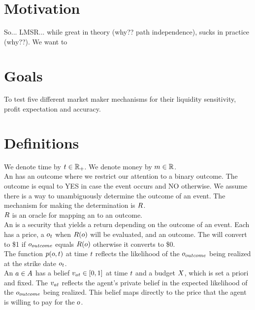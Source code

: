\section{Motivation}

So... LMSR... while great in theory (why?? path independence), sucks in practice (why??).
We want to 

\section{Goals}
To test five different market maker mechanisms for their liquidity sensitivity,
profit expectation and accuracy.  


\section{Definitions}

We denote time by $t\in\mathbb{R}_+$. We denote money by $m\in\mathbb{R}$.\\

An  has an outcome where we restrict our attention to a binary outcome. 
The outcome is equal to YES in case the event occurs and NO otherwise. We assume there 
is a way to unambiguously determine the outcome of an event. The mechanism for making
the determination is $R$.\\

$R$ is an oracle for mapping an  to an outcome.\\

An  is a security that yields a return depending on the outcome of an 
event. Each  has a price, a $o_{t}$ when $R(o)$ will be
evaluated, and an outcome. The  will convert to \$1 if $o_{outcome}$
equals $R(o)$ otherwise it converts to \$0.\\

The function $p(o,t)$ at time $t$ reflects the likelihood 
of the $o_{outcome}$ being realized at the strike date $o_{t}$.\\

An  $a\in A$ has a belief $v_{at} \in [0,1]$ 
at time $t$ and a budget $X$, which is set a priori and fixed. The $v_{at}$ 
reflects the agent's private belief in the expected likelihood of the $o_{outcome}$ 
being realized. This belief maps directly to the price that the agent is willing to pay 
for the $o$.\\

